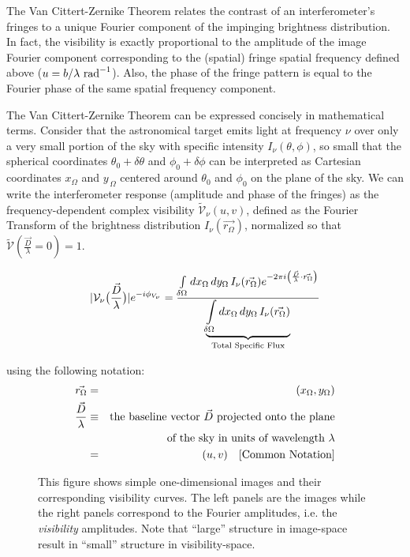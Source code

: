 \documentclass[12pt]{article}
\def\text{\rm}
\begin{document}
The Van Cittert-Zernike Theorem \citep[see][for complete discussion
and proof]{tms2001} relates the contrast of an interferometer's
fringes to a unique Fourier component of the impinging brightness
distribution.  In fact, the visibility is exactly proportional to the
amplitude of the image Fourier component corresponding to
the (spatial) fringe spatial frequency defined above ($u=b/\lambda
\text{ ~rad}^{-1}$).  Also, the phase of the fringe pattern is equal
to the Fourier phase of the same spatial frequency component.

The Van Cittert-Zernike Theorem can be expressed concisely in
mathematical terms. Consider that the astronomical target emits light
at frequency $\nu$ over only a very small portion of the sky with
specific intensity $I_\nu(\theta,\phi)$, so small that the spherical
coordinates $\theta_0+\delta\theta$ and $\phi_0+\delta\phi$ can be
interpreted as Cartesian coordinates $x_\Omega$ and $y_{\,\Omega}$
centered around $\theta_0$ and $\phi_0$ on the plane of the sky.  We
can write the interferometer response (amplitude and phase of the
fringes) as the frequency-dependent complex visibility
$\tilde{\mathcal V}_\nu(u,v)$, defined as the Fourier Transform of the
brightness distribution $I_\nu(\vec{r_{\Omega}})$, normalized so that
$\tilde{\mathcal V}(\frac{\vec{D}}{\lambda}=0) =1$.


\begin{equation}
|{\mathcal V}_\nu\big(\frac{\vec{D}}{\lambda}\big)|e^{-i\phi_{V_\nu}}
        =\frac{
         \int\limits_{\delta\Omega} dx_{\Omega}\,dy_{\Omega}\,
        I_\nu(\vec{r_\Omega})
           e^{-2\pi i\left(\frac{\vec{D}}{\lambda}\cdot\vec{r_\Omega}\right)}}{
        \underbrace{\int\limits_{\delta\Omega}dx_\Omega\,dy_{\Omega}\,
         I_\nu(\vec{r_\Omega})}_{\mbox{\scriptsize Total Specific Flux}}}
\end{equation}

using the following notation:
\begin{eqnarray}
 \vec{r_\Omega}&=&(x_\Omega,y_\Omega)\nonumber\\
 \frac{\vec{D}}{\lambda}&\equiv&
        \mbox{the baseline vector $\vec{D}$ projected onto the plane}\nonumber\\
        &&\mbox{of the sky in units of wavelength $\lambda$}\nonumber\\
        &=&(u,v) ~~~{\rm [Common~Notation]} \label{eq_uv}
\end{eqnarray}

\begin{figure}
\begin{center}

\centerline{}
\caption[Example 1-D images and visibility curves]{This figure shows 
simple one-dimensional images and their corresponding visibility curves.
The left panels are the images while the right panels correspond to the
Fourier amplitudes, i.e. the {\em visibility} amplitudes.  
Note that ``large'' structure in image-space result in
``small'' structure in visibility-space.}
\label{fig:visibility}
\end{center}
\end{figure}
\end{document}
